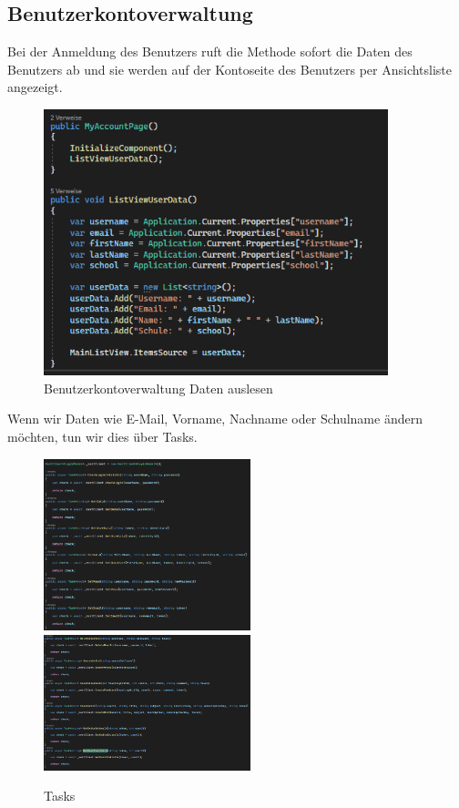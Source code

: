 \subsection{Benutzerkontoverwaltung}
Bei der Anmeldung des Benutzers ruft die Methode sofort die Daten des Benutzers ab und sie werden auf der Kontoseite des Benutzers per Ansichtsliste angezeigt.
\begin{figure}[h]
    \begin{center}\includegraphics[width=10cm]{pics/Xamarin Frontend/9.png}
    \caption[MyAccount]{Benutzerkontoverwaltung Daten auslesen}
    \end{center}
\end{figure}
\newline
Wenn wir Daten wie E-Mail, Vorname, Nachname oder Schulname ändern möchten, tun wir dies über Tasks.
\begin{figure}[h]
    \begin{center}
    \includegraphics[width=6cm]{pics/Xamarin Frontend/tasks.png}\hfill
    \includegraphics[width=6cm]{pics/Xamarin Frontend/tasks2.png}
    \caption[MyAccount]{Tasks}
    \end{center}
\end{figure}
